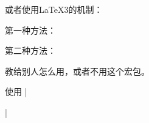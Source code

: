 或者使用\LaTeX{3}的机制：
\begin{texlist}
  \usepackage{xparse}
  \NewDocumentCommand{}
\end{texlist}





第一种方法：
\begin{texlist}
  \newcommand{\mycmd}[2][\DefaultOpt]{%
    \def\DefaultOpt{#2}%
    optional arg: #1,  mandatory arg: #2%
  }
\end{texlist}

第二种方法：
\begin{texlist}
  \def\mycmd{\futurelet\testchar\WithOptCmd}
  \def\WithOptCmd{%
    \ifx[\testchar 
      \let\next\OptCmd 
    \else 
      \let\next\NoOptCmd 
    \fi\next}
  \def\OptCmd[#1]#2{optional arg: #1,  mandatory arg: #2}
  \def\NoOptCmd#1{optional arg: #1,  mandatory arg: #1}
\end{texlist}



教给别人怎么用，或者不用这个宏包。





使用 |\usepackage{indentfirst}|



















